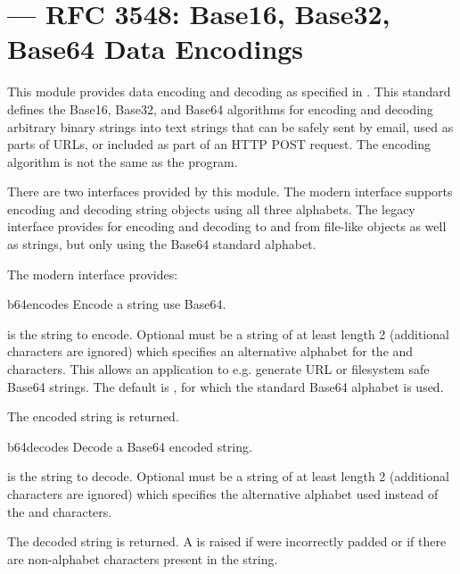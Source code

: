 \section{ ---
	 RFC 3548: Base16, Base32, Base64 Data Encodings}




This module provides data encoding and decoding as specified in
.  This standard defines the Base16, Base32, and Base64
algorithms for encoding and decoding arbitrary binary strings into
text strings that can be safely sent by email, used as parts of URLs,
or included as part of an HTTP POST request.  The encoding algorithm is
not the same as the  program.

There are two interfaces provided by this module.  The modern
interface supports encoding and decoding string objects using all
three alphabets.  The legacy interface provides for encoding and
decoding to and from file-like objects as well as strings, but only
using the Base64 standard alphabet.

The modern interface provides:

\begin{funcdesc}{b64encode}{s}
Encode a string use Base64.

 is the string to encode.  Optional  must be a
string of at least length 2 (additional characters are ignored) which
specifies an alternative alphabet for the \code{+} and \code{/}
characters.  This allows an application to e.g. generate URL or
filesystem safe Base64 strings.  The default is , for which
the standard Base64 alphabet is used.

The encoded string is returned.
\end{funcdesc}

\begin{funcdesc}{b64decode}{s}
Decode a Base64 encoded string.

 is the string to decode.  Optional  must be a
string of at least length 2 (additional characters are ignored) which
specifies the alternative alphabet used instead of the \code{+} and
\code{/} characters.

The decoded string is returned.  A  is raised if
 were incorrectly padded or if there are non-alphabet
characters present in the string.
\end{funcdesc}

